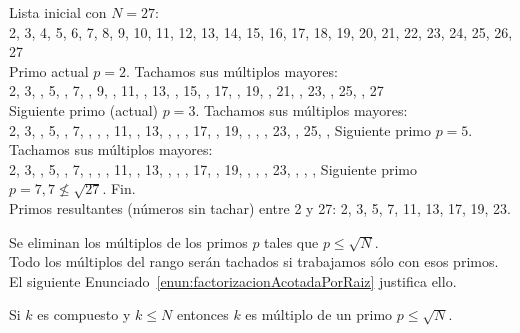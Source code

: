 \begin{ejemplo} Lista inicial con $N = 27$:\\
2, 3, 4, 5, 6, 7, 8, 9, 10, 11, 12, 13, 14, 15, 16, 17, 18, 19, 20, 21, 22, 23, 24, 25, 26, 27 \\
Primo actual $p = 2$. Tachamos sus múltiplos mayores:\\
2, 3, , 5, , 7, , 9, , 11, , 13, , 15, , 17, , 19, , 21, , 23, , 25, , 27 \\
Siguiente primo (actual) $p = 3$. Tachamos sus múltiplos mayores:\\
2, 3, , 5, , 7, , , , 11, , 13, , , , 17, , 19, , , , 23, , 25, , 
Siguiente primo $p = 5$. Tachamos sus múltiplos mayores:\\
2, 3, , 5, , 7, , , , 11, , 13, , , , 17, , 19, , , , 23, , , , 
Siguiente primo $p = 7, 7 \nleq \sqrt{27}$. Fin. \\
Primos resultantes (números sin tachar) entre 2 y 27: 2, 3, 5, 7, 11, 13, 17, 19, 23.
\end{ejemplo}

Se eliminan los múltiplos de los primos $p$ tales que $p \leq \sqrt{N}$.\\
Todo los múltiplos del rango serán tachados si trabajamos sólo con esos primos. El siguiente Enunciado~\ref{enun:factorizacionAcotadaPorRaiz} justifica ello.

\begin{enunciado} \label{enun:factorizacionAcotadaPorRaiz}\leavevmode\par Si $k$ es compuesto y $k \leq N$ entonces $k$ es múltiplo de un primo $p\leq \sqrt{N}$.
\end{enunciado}

